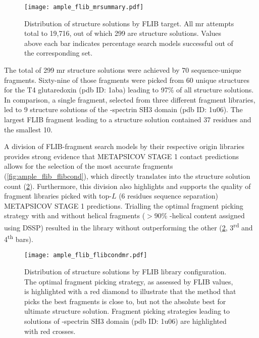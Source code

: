 \begin{figure}[H]
	\centering
	\texttt{[image: ample\_flib\_mrsummary.pdf]}
	\caption[MR structure solutions by FLIB target]{Distribution of structure solutions by FLIB target. All \gls{mr} attempts total to 19,716, out of which 299 are structure solutions. Values above each bar indicates percentage search models successful out of the corresponding set.}
	\label{fig:ample_flib_mrsummary}
\end{figure}

The total of 299 \gls{mr} structure solutions were achieved by 70 sequence-unique fragments. Sixty-nine of those fragments were picked from 60 unique structures for the T4 glutaredoxin (\gls{pdb} ID: 1aba) leading to 97\% of all structure solutions. In comparison, a single fragment, selected from three different fragment libraries, led to 9 structure solutions of the \textalpha-spectrin SH3 domain (\gls{pdb} ID: 1u06). The largest FLIB fragment leading to a structure solution contained 37 residues and the smallest 10.

A division of FLIB-fragment search models by their respective origin libraries provides strong evidence that METAPSICOV STAGE 1 contact predictions allows for the selection of the most accurate fragments (\cref{fig:ample_flib_flibcond}), which directly translates into the structure solution count (\cref{fig:ample_flib_flibcondmr}). Furthermore, this division also highlights and supports the quality of fragment libraries picked with top-$L$ (6 residues sequence separation) METAPSICOV STAGE 1 predictions. Trialling the optimal fragment picking strategy with and without helical fragments ($>90$\% \textalpha-helical content assigned using DSSP) resulted in the library without outperforming the other (\cref{fig:ample_flib_flibcondmr}, 3\textsuperscript{rd} and 4\textsuperscript{th} bars). 

\begin{figure}[H]
	\centering
	\texttt{[image: ample\_flib\_flibcondmr.pdf]}
	\caption[MR structure solutions by FLIB library]{Distribution of structure solutions by FLIB library configuration. The optimal fragment picking strategy, as assessed by FLIB values, is highlighted with a red diamond to illustrate that the method that picks the best fragments is close to, but not the absolute best for ultimate structure solution. Fragment picking strategies leading to solutions of \textalpha-spectrin SH3 domain (\gls{pdb} ID: 1u06) are highlighted with red crosses.}
	\label{fig:ample_flib_flibcondmr}
\end{figure}

